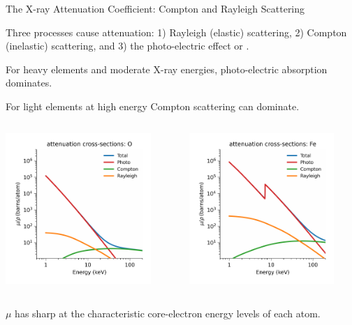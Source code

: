 \begin{slide}{The X-ray Attenuation Coefficient: Compton and Rayleigh Scattering}

  \begin{cenpage}{125mm}
    Three processes cause attenuation: 1) Rayleigh (elastic) scattering, 2)
    Compton (inelastic) scattering, and 3) the photo-electric effect or
    {}.
    
  \vmm

  For heavy elements and moderate X-ray
  energies, photo-electric absorption dominates.
  \vmm


  \vmm
  For light elements at high energy Compton scattering can dominate.
  \vmm


  
  \end{cenpage}
      

  \begin{columns}[T]
    \begin{column}{65mm}

      \includegraphics[width=55mm]{figs/general/mu_xsections_O}
  
    \end{column}
    \begin{column}{65mm}
      
      \includegraphics[width=55mm]{figs/general/mu_xsections_Fe}

    \end{column}
  \end{columns}

\begin{cenpage}{130mm}
  $\mu$ has sharp {} at the characteristic
  core-electron energy levels of each atom.
\end{cenpage}

\vmm
\vfill

\end{slide}


